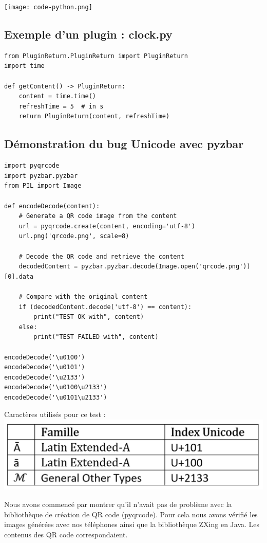 \documentclass[a4paper,12pt]{article}
\begin{document}
\noindent\texttt{[image: code-python.png]}

\subsection{Exemple d'un plugin : clock.py }
\label{clock}
\begin{lstlisting}
from PluginReturn.PluginReturn import PluginReturn
import time

def getContent() -> PluginReturn:
    content = time.time()
    refreshTime = 5  # in s
    return PluginReturn(content, refreshTime)
\end{lstlisting}

\newpage

\subsection{Démonstration du bug Unicode avec pyzbar}
\label{bug_unicode}
\begin{lstlisting}
import pyqrcode
import pyzbar.pyzbar
from PIL import Image

def encodeDecode(content):
    # Generate a QR code image from the content
    url = pyqrcode.create(content, encoding='utf-8')
    url.png('qrcode.png', scale=8)

    # Decode the QR code and retrieve the content
    decodedContent = pyzbar.pyzbar.decode(Image.open('qrcode.png'))[0].data

    # Compare with the original content
    if (decodedContent.decode('utf-8') == content):
        print("TEST OK with", content)
    else:
        print("TEST FAILED with", content)
    
encodeDecode('\u0100')
encodeDecode('\u0101')
encodeDecode('\u2133')
encodeDecode('\u0100\u2133')
encodeDecode('\u0101\u2133')
\end{lstlisting}

Caractères utilisés pour ce test :\\
\noindent\includegraphics[width=.5\textwidth]{caractères.png}

\noindent Nous avons commencé par montrer qu'il n'avait pas de problème avec la bibliothèque de création de QR code (pyqrcode). Pour cela nous avons vérifié les images générées avec nos téléphones ainsi que la bibliothèque ZXing en Java. Les contenus des QR code correspondaient.
\end{document}
